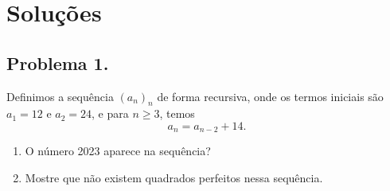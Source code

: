 \documentclass[12pt]{article}
\begin{document}
  \clearpage

  \section{\textsf{Soluções}}
    \subsection{Problema 1.}
      \begin{tcolorbox}[problembox={Enunciado do problema}]
        Definimos a sequência \( (a_n)_n \) de forma recursiva, onde os termos
        iniciais são \( a_1 = 12 \) e \( a_2 = 24 \), e para \( n \geq 3 \), temos
        \[
          a_n = a_{n-2} + 14.
        \]
        \begin{enumerate}[label=(\alph*)]
          \item O número 2023 aparece na sequência?
          \item Mostre que não existem quadrados perfeitos nessa sequência.
        \end{enumerate}
      \end{tcolorbox}
\end{document}
